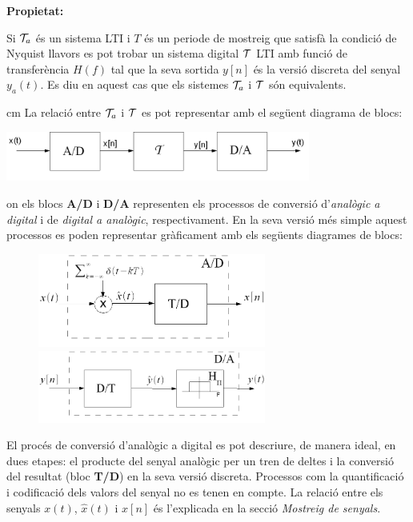 \documentclass{article}
\begin{document}
\noindent
\textbf{Propietat:} 

\noindent
Si ${\cal T}_a$ \'es un sistema LTI i 
$T$ \'es un periode de mostreig que satisf\`a la condici\'o de Nyquist llavors es pot trobar
un sistema digital ${\cal T}$ LTI amb funci\'o de transfer\`encia $H(f)$ tal que la
seva sortida $y[n]$ \'es la versi\'o discreta del senyal $y_a(t)$. Es diu en aquest cas
que els sistemes ${\cal T}_a$ i ${\cal T}$ s\'on equivalents.

 cm
\noindent
La relaci\'o entre ${\cal T}_a$ i ${\cal T}$ es pot representar amb el seg\"uent diagrama de blocs:

\begin{center}
\begin{minipage}{10cm} \includegraphics[width=10cm]{sistemadigital.png}\end{minipage}
\end{center}

\noindent
on els blocs \textbf{A/D} i \textbf{D/A} representen els processos de conversi\'o 
d'\textit{anal\`ogic a digital} i de \textit{digital a anal\`ogic}, respectivament. 
En la seva versi\'o m\'es simple aquest processos es poden representar gr\`aficament
amb els seg\"uents diagrames de blocs:

\begin{figure}[htbp]
\begin{center}
\includegraphics[width=7.5cm]{AD.png}
$\qquad$
\includegraphics[width=7.5cm]{DA.png}
\end{center}
\end{figure}

El proc\'es de conversi\'o d'anal\`ogic a digital es pot descriure, de manera ideal, en dues etapes: el producte
del senyal anal\`ogic per un tren de deltes i la conversi\'o del resultat (bloc \textbf{T/D}) en la seva versi\'o 
discreta. Processos com la quantificaci\'o i codificaci\'o dels valors del senyal no es tenen en compte.
La relació entre els senyals $x(t)$, $\hat{x}(t)$ i $x[n]$ és l'explicada en la secció \textit{Mostreig de senyals}.
\end{document}
